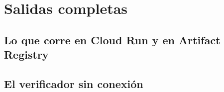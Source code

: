 \documentclass[11pt,letterpaper]{article}
\begin{document}

\section{Salidas completas}

\subsection*{Lo que corre en Cloud Run y en Artifact Registry}
\begin{salida}
\end{salida}

\subsection*{El verificador sin conexión}
\begin{salida}
\end{salida}
\end{document}
